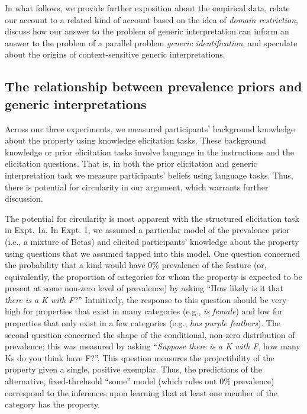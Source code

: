 \documentclass[,man,floatsintext]{apa6}
\theoremstyle{definition}
\theoremstyle{definition}
\theoremstyle{definition}
\theoremstyle{remark}
\begin{document}
In what follows, we provide further exposition about the empirical data,
relate our account to a related kind of account based on the idea of
\emph{domain restriction}, discuss how our answer to the problem of
generic interpretation can inform an answer to the problem of a parallel
problem \emph{generic identification}, and speculate about the origins
of context-sensitive generic interpretations.


\subsection{The relationship between prevalence priors and generic
interpretations}\label{the-relationship-between-prevalence-priors-and-generic-interpretations}

Across our three experiments, we measured participants' background
knowledge about the property using knowledge elicitation tasks. These
background knowledge or prior elicitation tasks involve language in the
instructions and the elicitation questions. That is, in both the prior
elicitation and generic interpretation task we measure participants'
beliefs using language tasks. Thus, there is potential for circularity
in our argument, which warrants further discussion.

The potential for circularity is most apparent with the structured
elicitation task in Expt. 1a. In Expt. 1, we assumed a particular model
of the prevalence prior (i.e., a mixture of Betas) and elicited
participants' knowledge about the property using questions that we
assumed tapped into this model. One question concerned the probability
that a kind would have 0\% prevalence of the feature (or, equivalently,
the proportion of categories for whom the property is expected to be
present at some non-zero level of prevalence) by asking \enquote{How
likely is it that \emph{there is a K with F}?} Intuitively, the response
to this question should be very high for properties that exist in many
categories (e.g., \emph{is female}) and low for properties that only
exist in a few categories (e.g., \emph{has purple feathers}). The second
question concerned the shape of the conditional, non-zero distribution
of prevalence; this was measured by asking \enquote{\emph{Suppose there
is a K with F}, how many Ks do you think have F?}. This question
measures the projectibility of the property given a single, positive
exemplar. Thus, the predictions of the alternative, fixed-threhsold
\enquote{some} model (which rules out 0\% prevalence) correspond to the
inferences upon learning that at least one member of the category has
the property.
\end{document}
